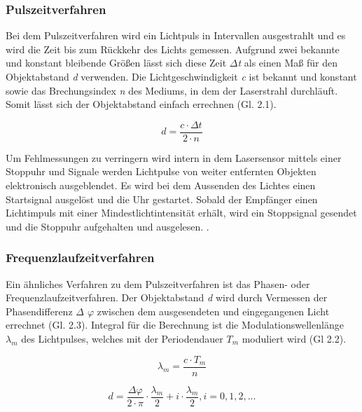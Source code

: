 \subsubsection{Pulszeitverfahren}
Bei dem Pulszeitverfahren wird ein Lichtpuls in Intervallen ausgestrahlt und es wird die Zeit bis zum Rückkehr des Lichts gemessen. Aufgrund zwei bekannte und konstant bleibende Größen lässt sich diese Zeit \emph{$\Delta$t} als einen Maß für den Objektabstand \emph{d} verwenden. Die Lichtgeschwindigkeit \emph{c} ist bekannt und konstant sowie das Brechungsindex \emph{n} des Mediums, in dem der Laserstrahl durchläuft. Somit lässt sich der Objektabstand einfach errechnen (Gl. 2.1). \autocite[171]{Hering2018}

\begin{equation}
	d = \frac{c \cdot \Delta t}{2 \cdot n}
\end{equation}

Um Fehlmessungen zu verringern wird intern in dem Lasersensor mittels einer Stoppuhr und Signale werden Lichtpulse von weiter entfernten Objekten elektronisch ausgeblendet. Es wird bei dem Aussenden des Lichtes einen Startsignal ausgelöst und die Uhr gestartet. Sobald der Empfänger einen Lichtimpuls mit einer Mindestlichtintensität erhält, wird ein Stoppsignal gesendet und die Stoppuhr aufgehalten und ausgelesen. \autocite[171]{Hering2018}.

\subsubsection{Frequenzlaufzeitverfahren}

Ein ähnliches Verfahren zu dem Pulszeitverfahren ist das Phasen- oder Frequenzlaufzeitverfahren. Der Objektabstand \emph{d} wird durch Vermessen der Phasendifferenz \emph{$\Delta$ $\varphi$} zwischen dem ausgesendeten und eingegangenen Licht errechnet (Gl. 2.3). Integral für die Berechnung ist die Modulationswellenlänge \emph{$\lambda_m$} des Lichtpulses, welches mit der Periodendauer \emph{$T_m$} moduliert wird (Gl 2.2). \autocite[171]{Hering2018}

\begin{equation}
	\lambda_m = \frac{c \cdot T_m}{n}
\end{equation}

\begin{equation}
			d = \frac{\Delta \varphi}{2 \cdot \pi} \cdot \frac{\lambda_m}{2} + i \cdot \frac{\lambda_m}{2}, i=0,1,2,...
\end{equation}

